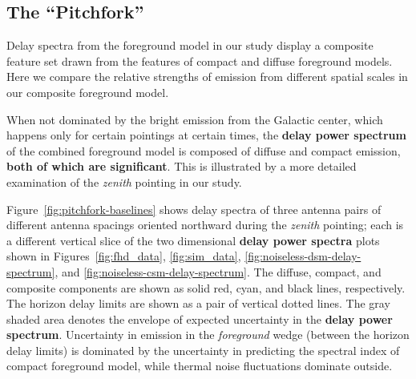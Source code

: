 \documentclass[preprint2,iop,numberedappendix]{emulateapj}
\begin{document}
\subsection{The ``Pitchfork''}\label{sec:composite}

Delay spectra from the foreground model in our study display a composite feature set drawn from the features of compact and diffuse foreground models. Here we compare the relative strengths of emission from different spatial scales in our composite foreground model. 

When not dominated by the bright emission from the Galactic center, which happens only for certain pointings at certain times, the {\bf delay power spectrum} of the combined foreground model is composed of diffuse and compact emission, {\bf both of which are significant}. This is illustrated by a more detailed examination of the {\it zenith} pointing in our study. 

Figure~\ref{fig:pitchfork-baselines} shows delay spectra of three antenna pairs of different antenna spacings oriented northward during the {\it zenith} pointing; each is a different vertical slice of the two dimensional {\bf delay power spectra} plots shown in Figures~\ref{fig:fhd_data}, \ref{fig:sim_data}, \ref{fig:noiseless-dsm-delay-spectrum}, and \ref{fig:noiseless-csm-delay-spectrum}. The diffuse, compact, and composite components are shown as solid red, cyan, and black lines, respectively. The horizon delay limits are shown as a pair of vertical dotted lines. The gray shaded area denotes the envelope of expected uncertainty in the {\bf delay power spectrum}. Uncertainty in emission in the {\it foreground} wedge (between the horizon delay limits) is dominated by the %
uncertainty in predicting the spectral index of compact foreground model, while thermal noise fluctuations dominate outside. 
\end{document}
